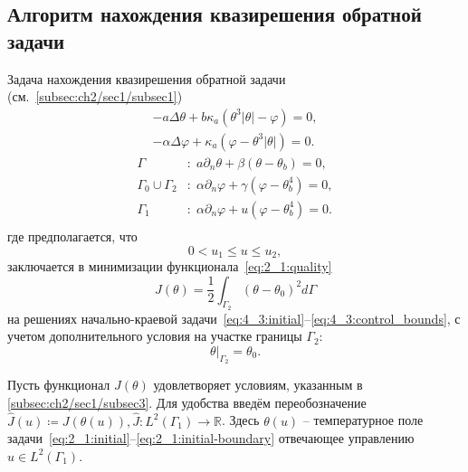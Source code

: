 \subsection{Алгоритм нахождения квазирешения обратной задачи}
\label{subsec:ch4/sec3/boundary}

Задача нахождения квазирешения обратной
задачи (см.~\ref{subsec:ch2/sec1/subsec1})
\begin{equation}
    \label{eq:4_3:initial}
    \begin{aligned}
        - a \Delta \theta + b \kappa_a(\theta ^ 3 | \theta | - \varphi) = 0,  \\
        - \alpha \Delta \varphi + \kappa_a (\varphi - \theta ^3 | \theta |) = 0.
    \end{aligned}
\end{equation}
\begin{equation}
    \label{eq:4_3:initial-boundary}
    \begin{aligned}
        \Gamma &: \; a \partial_n \theta + \beta (\theta - \theta _b) = 0, \\
        \Gamma_0 \cup \Gamma_2 &: \; \alpha \partial_n \varphi
        + \gamma(\varphi - \theta_b ^4 ) = 0, \\
        \Gamma_1 &: \; \alpha \partial_n \varphi + u(\varphi - \theta_b ^4 ) = 0. \\
    \end{aligned}
\end{equation}
где предполагается, что
\begin{equation}
    \label{eq:4_3:control_bounds}
    0 < u_1 \leq u \leq u_2,
\end{equation}
заключается в минимизации функционала~\eqref{eq:2_1:quality}
\begin{equation}
    \label{eq:4_3:quality}
    J(\theta) = \frac{1}{2} \int_{\Gamma_2} (\theta - \theta_0)^2 d\Gamma
\end{equation}
на решениях начально-краевой задачи~\eqref{eq:4_3:initial}--\eqref{eq:4_3:control_bounds},
с учетом дополнительного условия на участке границы $\Gamma_2$:
\begin{equation}
    \label{eq:4_3:theta_gamma}
    \theta|_{\Gamma_2}=\theta_0.
\end{equation}

Пусть функционал $J(\theta)$ удовлетворяет условиям,
указанным в \autoref{subsec:ch2/sec1/subsec3}.
Для удобства введём переобозначение
$\hat{J}(u)\coloneqq J(\theta(u)), \hat{J}:L^2(\Gamma_1) \to \mathbb{R}$.
Здесь $\theta(u)$ -- температурное поле
задачи~\eqref{eq:2_1:initial}--\eqref{eq:2_1:initial-boundary}
отвечающее управлению $u \in L^2(\Gamma_1)$.

